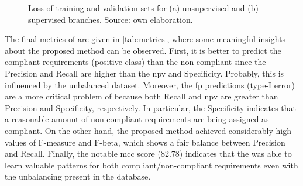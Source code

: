 \begin{figure}[tb]
\centering
{}
\hfill
\ContinuedFloat
{}
\caption{Loss of training and validation sets for (a) unsupervised and (b) supervised branches. Source: own elaboration.}
\label{fig:losses}
\end{figure}

The final metrics of \methodname are given in \autoref{tab:metrics}, where some meaningful insights about the proposed method can be observed. First, it is better to predict the compliant requirements (positive class) than the non-compliant since the Precision and Recall are higher than the \acs{npv} and Specificity. Probably, this is influenced by the unbalanced dataset. Moreover, the \acl{fp} predictions (type-I error) are a more critical problem of \methodname because both Recall and \acs{npv} are greater than Precision and Specificity, respectively. In particular, the Specificity indicates that a reasonable amount of non-compliant requirements are being assigned as compliant. On the other hand, the proposed method achieved considerably high values of F-measure and F-beta, which shows a fair balance between Precision and Recall. Finally, the notable \acs{mcc} score (82.78) indicates that the \methodname was able to learn valuable patterns for both compliant/non-compliant requirements even with the unbalancing present in the \adhoc database.

